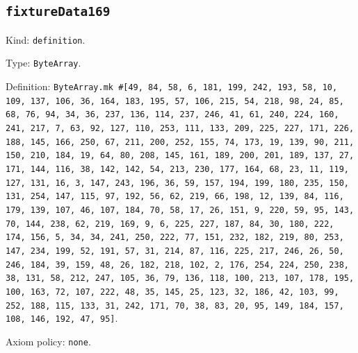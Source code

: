 \documentclass[11pt]{article}
\begin{document}
\subsection*{\texttt{fixtureData169}}
\noindent Kind: \texttt{definition}.\par
\noindent Type: \texttt{ByteArray}.\par
\noindent Definition: \texttt{ByteArray.mk \#[49, 84, 58, 6, 181, 199, 242, 193, 58, 10, 109, 137, 106, 36, 164, 183, 195, 57, 106, 215, 54, 218, 98, 24, 85, 68, 76, 94, 34, 36, 237, 136, 114, 237, 246, 41, 61, 240, 224, 160, 241, 217, 7, 63, 92, 127, 110, 253, 111, 133, 209, 225, 227, 171, 226, 188, 145, 166, 250, 67, 211, 200, 252, 155, 74, 173, 19, 139, 90, 211, 150, 210, 184, 19, 64, 80, 208, 145, 161, 189, 200, 201, 189, 137, 27, 171, 144, 116, 38, 142, 142, 54, 213, 230, 177, 164, 68, 23, 11, 119, 127, 131, 16, 3, 147, 243, 196, 36, 59, 157, 194, 199, 180, 235, 150, 131, 254, 147, 115, 97, 192, 56, 62, 219, 66, 198, 12, 139, 84, 116, 179, 139, 107, 46, 107, 184, 70, 58, 17, 26, 151, 9, 220, 59, 95, 143, 70, 144, 238, 62, 219, 169, 9, 6, 225, 227, 187, 84, 30, 180, 222, 174, 156, 5, 34, 34, 241, 250, 222, 77, 151, 232, 182, 219, 80, 253, 147, 234, 199, 52, 191, 57, 31, 214, 87, 116, 225, 217, 246, 26, 50, 246, 184, 39, 159, 48, 26, 182, 218, 102, 2, 176, 254, 224, 250, 238, 38, 131, 58, 212, 247, 105, 36, 79, 136, 118, 100, 213, 107, 178, 195, 100, 163, 72, 107, 222, 48, 35, 145, 25, 123, 32, 186, 42, 103, 99, 252, 188, 115, 133, 31, 242, 171, 70, 38, 83, 20, 95, 149, 184, 157, 108, 146, 192, 47, 95]}.\par
\noindent Axiom policy: \texttt{none}.\par
\end{document}
